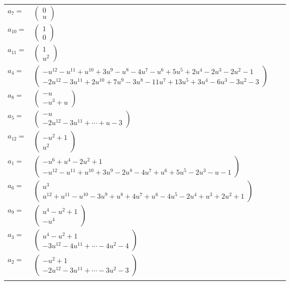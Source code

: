 \documentclass[1p]{elsarticle_modified}
\theoremstyle{definition}
\begin{document}
\begin{tabular}{m{7pt} m{180pt} m{7pt} m{180pt} }
\flushright $a_{7}=$&$\begin{pmatrix}0\\u\end{pmatrix}$ \\
\flushright $a_{10}=$&$\begin{pmatrix}1\\0\end{pmatrix}$ \\
\flushright $a_{11}=$&$\begin{pmatrix}1\\u^2\end{pmatrix}$ \\
\flushright $a_{4}=$&$\begin{pmatrix}- u^{12}- u^{11}+u^{10}+3 u^9- u^8-4 u^7- u^6+5 u^5+2 u^4-2 u^3-2 u^2-1\\-2 u^{12}-3 u^{11}+2 u^{10}+7 u^9-3 u^8-11 u^7+13 u^5+3 u^4-6 u^3-3 u^2-3\end{pmatrix}$ \\
\flushright $a_{8}=$&$\begin{pmatrix}- u\\- u^3+u\end{pmatrix}$ \\
\flushright $a_{5}=$&$\begin{pmatrix}- u\\-2 u^{12}-3 u^{11}+\cdots+u-3\end{pmatrix}$ \\
\flushright $a_{12}=$&$\begin{pmatrix}- u^2+1\\u^2\end{pmatrix}$ \\
\flushright $a_{1}=$&$\begin{pmatrix}- u^6+u^4-2 u^2+1\\- u^{12}- u^{11}+u^{10}+3 u^9-2 u^8-4 u^7+u^6+5 u^5-2 u^3- u-1\end{pmatrix}$ \\
\flushright $a_{6}=$&$\begin{pmatrix}u^3\\u^{12}+u^{11}- u^{10}-3 u^9+u^8+4 u^7+u^6-4 u^5-2 u^4+u^3+2 u^2+1\end{pmatrix}$ \\
\flushright $a_{9}=$&$\begin{pmatrix}u^4- u^2+1\\- u^4\end{pmatrix}$ \\
\flushright $a_{3}=$&$\begin{pmatrix}u^4- u^2+1\\-3 u^{12}-4 u^{11}+\cdots-4 u^2-4\end{pmatrix}$ \\
\flushright $a_{2}=$&$\begin{pmatrix}- u^2+1\\-2 u^{12}-3 u^{11}+\cdots-3 u^2-3\end{pmatrix}$\\&\end{tabular}
\end{document}
